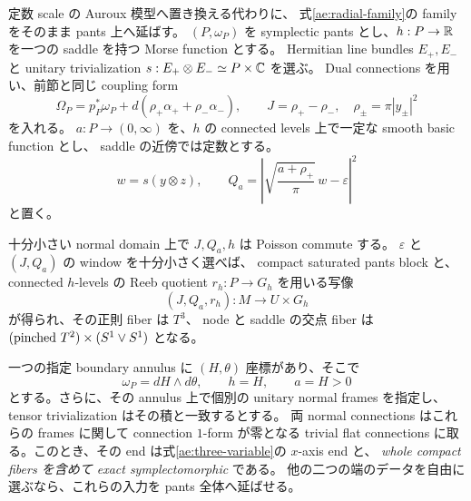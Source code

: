 定数 scale の Auroux 模型へ置き換える代わりに、
式\eqref{ae:radial-family}の family をそのまま pants 上へ延ばす。
$(P,\omega_P)$ を symplectic pants とし、$h:P\to\mathbb R$ を一つの saddle を持つ
Morse function とする。
Hermitian line bundles $E_+,E_-$ と unitary trivialization
$s:E_+\otimes E_-\simeq P\times\mathbb C$ を選ぶ。
Dual connections を用い、前節と同じ coupling form
\[
 \Omega_P=p_P^*\omega_P+d(\rho_+\alpha_++\rho_-\alpha_-),
 \qquad J=\rho_+-\rho_-,\quad \rho_\pm=\pi|y_\pm|^2
\]
を入れる。
$a:P\to(0,\infty)$ を、$h$ の connected levels 上で一定な smooth basic function とし、
saddle の近傍では定数とする。
\begin{equation}\label{ae:pants-family}
 w=s(y\otimes z),\qquad
 Q_a=\left|\sqrt{\frac{a+\rho_+}{\pi}}\,w-\varepsilon\right|^2
\end{equation}
と置く。

\begin{theorem}\label{ae:one-end-pants}
十分小さい normal domain 上で $J,Q_a,h$ は Poisson commute する。
$\varepsilon$ と $(J,Q_a)$ の window を十分小さく選べば、
compact saturated pants block と、connected $h$-levels の Reeb quotient $r_h:P\to G_h$ を用いる写像
\[
 (J,Q_a,r_h):M\longrightarrow U\times G_h
\]
が得られ、その正則 fiber は $T^3$、
node と saddle の交点 fiber は
$(\text{pinched }T^2)\times(S^1\vee S^1)$ となる。

一つの指定 boundary annulus に $(H,\theta)$ 座標があり、そこで
\[
 \omega_P=dH\wedge d\theta,\qquad h=H,\qquad a=H>0
\]
とする。さらに、その annulus 上で個別の unitary normal frames を指定し、
tensor trivialization はその積と一致するとする。
両 normal connections はこれらの frames に関して connection $1$-form が零となる
trivial flat connections に取る。このとき、その end は式\eqref{ae:three-variable}の $x$-axis end と、
\emph{whole compact fibers を含めて exact symplectomorphic} である。
他の二つの端のデータを自由に選ぶなら、これらの入力を pants 全体へ延ばせる。
\end{theorem}

